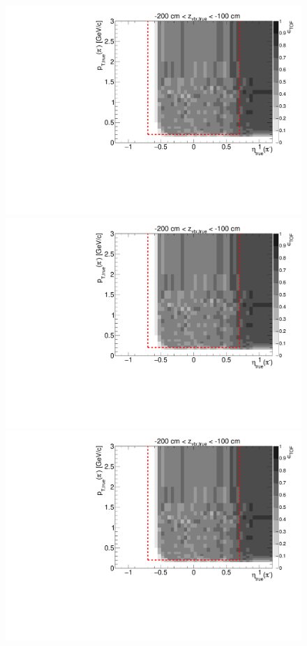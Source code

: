 \begin{figure}[hb]
{}~
\parbox{0.495\textwidth}{
  \centering
  \includegraphics[width=\linewidth,page=4]{graphics/eff/Eff2D_TOF_pion_Minus.pdf}\\
  \includegraphics[width=\linewidth,page=6]{graphics/eff/Eff2D_TOF_pion_Minus.pdf}\\
  \includegraphics[width=\linewidth,page=8]{graphics/eff/Eff2D_TOF_pion_Minus.pdf}\\
}
\end{figure}
